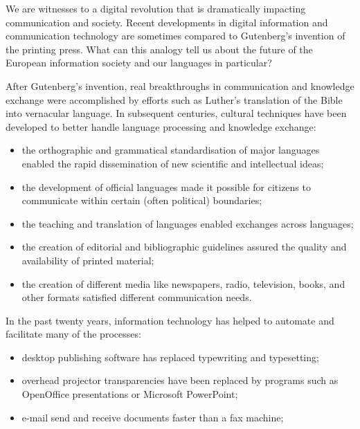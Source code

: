 \begin{multicols}{2}
  We are witnesses to a digital revolution that is dramatically impacting communication and society. Recent developments in digital information and communication technology are sometimes compared to Gutenberg’s invention of the printing press. What can this analogy tell us about the future of the European information society and our languages in particular?

After Gutenberg’s invention, real breakthroughs in communication and knowledge
exchange were accomplished by efforts such as Luther’s translation of the Bible
into vernacular language. In subsequent centuries, cultural techniques have
been developed to better handle language processing and knowledge exchange:

\begin{itemize}
\item the orthographic and grammatical standardisation of major languages enabled the
rapid dissemination of new scientific and intellectual ideas;

\item the development of official languages made it possible for citizens to
communicate within certain (often political) boundaries;

\item the teaching and translation of languages enabled exchanges across languages;

\item the creation of editorial and bibliographic guidelines assured the quality and
availability of printed material;

\item the creation of different media like newspapers, radio, television, books, and
other formats satisfied different communication needs.
\end{itemize}
\columnbreak

In the past twenty years, information technology has helped to automate and
facilitate many of the processes:

\begin{itemize}
\item desktop publishing software has replaced typewriting and typesetting;

\item overhead projector transparencies have been replaced by programs such as
OpenOffice presentations or Microsoft PowerPoint;

\item e-mail send and receive documents faster than a fax machine;


\end{itemize}
\end{multicols}
